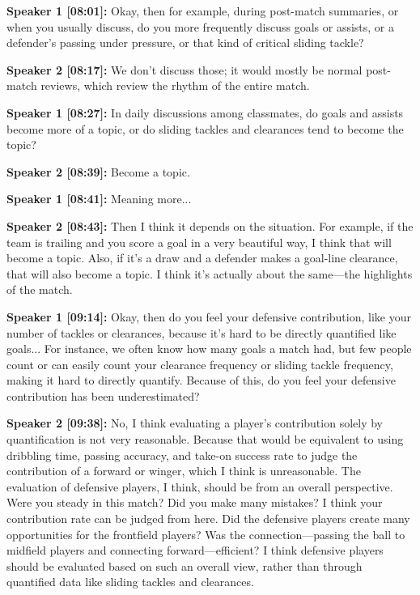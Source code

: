 \documentclass[11pt,a4paper]{article}
\begin{document}
\begin{linenumbers}
\vspace{0.5em}
\noindent \textbf{Speaker 1 [08:01]:} Okay, then for example, during post-match summaries, or when you usually discuss, do you more frequently discuss goals or assists, or a defender's passing under pressure, or that kind of critical sliding tackle?

\vspace{0.5em}
\noindent \textbf{Speaker 2 [08:17]:} We don't discuss those; it would mostly be normal post-match reviews, which review the rhythm of the entire match.

\vspace{0.5em}
\noindent \textbf{Speaker 1 [08:27]:} In daily discussions among classmates, do goals and assists become more of a topic, or do sliding tackles and clearances tend to become the topic?

\vspace{0.5em}
\noindent \textbf{Speaker 2 [08:39]:} Become a topic.

\vspace{0.5em}
\noindent \textbf{Speaker 1 [08:41]:} Meaning more...

\vspace{0.5em}
\noindent \textbf{Speaker 2 [08:43]:} Then I think it depends on the situation. For example, if the team is trailing and you score a goal in a very beautiful way, I think that will become a topic. Also, if it's a draw and a defender makes a goal-line clearance, that will also become a topic. I think it's actually about the same---the highlights of the match.

\vspace{0.5em}
\noindent \textbf{Speaker 1 [09:14]:} Okay, then do you feel your defensive contribution, like your number of tackles or clearances, because it's hard to be directly quantified like goals... For instance, we often know how many goals a match had, but few people count or can easily count your clearance frequency or sliding tackle frequency, making it hard to directly quantify. Because of this, do you feel your defensive contribution has been underestimated?

\vspace{0.5em}
\noindent \textbf{Speaker 2 [09:38]:} No, I think evaluating a player's contribution solely by quantification is not very reasonable. Because that would be equivalent to using dribbling time, passing accuracy, and take-on success rate to judge the contribution of a forward or winger, which I think is unreasonable. The evaluation of defensive players, I think, should be from an overall perspective. Were you steady in this match? Did you make many mistakes? I think your contribution rate can be judged from here. Did the defensive players create many opportunities for the frontfield players? Was the connection---passing the ball to midfield players and connecting forward---efficient? I think defensive players should be evaluated based on such an overall view, rather than through quantified data like sliding tackles and clearances.


\end{linenumbers}
\end{document}

